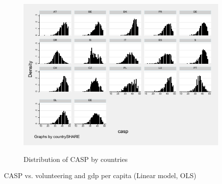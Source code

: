\documentclass[10pt, letterpaper]{article}
\begin{document}
\begin{spacing}{1.4}
\begin{spacing}{.9}
\begin{figure}[H]
 \includegraphics[height=3in]{hist_casp.pdf}
 \centering
 \label{fig:hist_casp}
\caption{Distribution of CASP by countries}
\end{figure}


\begin{spacing}{.9}
	 
      \label{CASP}
\end{spacing}


\begin{spacing}{.9}
	 
      \label{sphus}
\end{spacing}



\begin{spacing}{.9}
	 
      \label{tauH} 
\end{spacing}

\begin{spacing}{.9}
	 
      \label{tauLS} 
\end{spacing}


\begin{spacing}{.9}
\begin{table}[H]
\centering 
\caption{CASP vs. volunteering and gdp per capita (Linear model, OLS)}  
\begin{scriptsize} 
	 
      \label{regOLS} 
\end{scriptsize}
\end{table}
\end{spacing}


\end{spacing}
\end{spacing}
\end{document}
